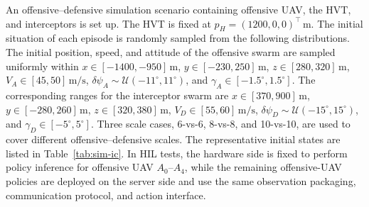 \documentclass{cja}
\begin{document}
An offensive--defensive simulation scenario containing offensive UAV, the HVT, and interceptors is set up. The HVT is fixed at $p_H=(1200,0,0)^\top\,\mathrm{m}$.
The initial situation of each episode is randomly sampled from the following distributions. The initial position, speed, and attitude of the offensive swarm are sampled uniformly within $x\in[-1400,-950]\,\mathrm{m}$, $y\in[-230,250]\,\mathrm{m}$, $z\in[280,320]\,\mathrm{m}$, $V_A\in[45,50]\,\mathrm{m/s}$, $\delta\psi_A\sim\mathcal{U}(-11^\circ,11^\circ)$, and $\gamma_A\in[-1.5^\circ,1.5^\circ]$. The corresponding ranges for the interceptor swarm are $x\in[370,900]\,\mathrm{m}$, $y\in[-280,260]\,\mathrm{m}$, $z\in[320,380]\,\mathrm{m}$, $V_D\in[55,60]\,\mathrm{m/s}$, $\delta\psi_D\sim\mathcal{U}(-15^\circ,15^\circ)$, and $\gamma_D\in[-5^\circ,5^\circ]$.
Three scale cases, 6-vs-6, 8-vs-8, and 10-vs-10, are used to cover different offensive--defensive scales. The representative initial states are listed in Table~\ref{tab:sim-ic}.
In HIL tests, the hardware side is fixed to perform policy inference for offensive UAV $A_0$--$A_4$, while the remaining offensive-UAV policies are deployed on the server side and use the same observation packaging, communication protocol, and action interface.
\end{document}
